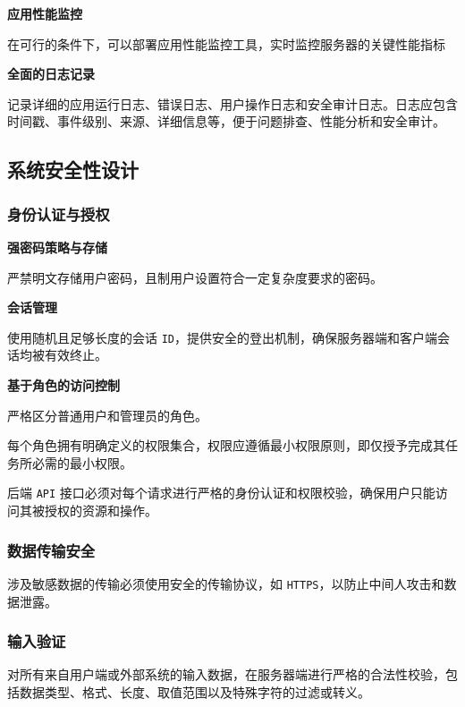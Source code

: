 \documentclass[12pt,a4paper,UTF8]{article}
\begin{document}
\noindent\textbf{应用性能监控}

在可行的条件下，可以部署应用性能监控工具，实时监控服务器的关键性能指标

\vspace{0.25cm}

\noindent\textbf{全面的日志记录}

记录详细的应用运行日志、错误日志、用户操作日志和安全审计日志。日志应包含时间戳、事件级别、来源、详细信息等，便于问题排查、性能分析和安全审计。


\subsection{系统安全性设计}

\subsubsection{身份认证与授权}

\noindent\textbf{强密码策略与存储}

严禁明文存储用户密码，且制用户设置符合一定复杂度要求的密码。

\vspace{0.25cm}

\noindent\textbf{会话管理}

使用随机且足够长度的会话 \verb|ID|，提供安全的登出机制，确保服务器端和客户端会话均被有效终止。

\vspace{0.25cm}

\noindent\textbf{基于角色的访问控制}

严格区分普通用户和管理员的角色。

每个角色拥有明确定义的权限集合，权限应遵循最小权限原则，即仅授予完成其任务所必需的最小权限。

后端 \verb|API| 接口必须对每个请求进行严格的身份认证和权限校验，确保用户只能访问其被授权的资源和操作。

\subsubsection{数据传输安全}

涉及敏感数据的传输必须使用安全的传输协议，如 \verb|HTTPS|，以防止中间人攻击和数据泄露。

\subsubsection{输入验证}

对所有来自用户端或外部系统的输入数据，在服务器端进行严格的合法性校验，包括数据类型、格式、长度、取值范围以及特殊字符的过滤或转义。
\end{document}

